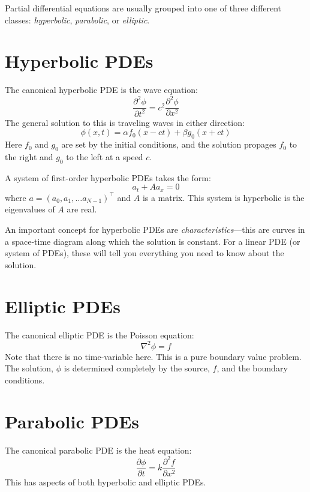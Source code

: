 Partial differential equations are usually grouped into one of 
three different classes: {\em hyperbolic}, {\em parabolic}, 
or {\em elliptic}.


\section{Hyperbolic PDEs}

The canonical hyperbolic PDE is the wave equation:
\begin{equation}
  \frac{\partial^2 \phi}{\partial t^2} = c^2 \frac{\partial^2 \phi}{\partial x^2}
\end{equation}   
The general solution to this is traveling waves in either direction:
\begin{equation}
  \phi(x,t) = \alpha f_0(x - ct) + \beta g_0(x + ct)
\end{equation}
Here $f_0$ and $g_0$ are set by the initial
conditions, and the solution propages $f_0$ to the right and $g_0$ to
the left at a speed $c$.

A system of first-order hyperbolic PDEs takes the form:
\begin{equation}
a_t + A a_x = 0
\end{equation}
where $a = (a_0, a_1, \ldots a_{N-1})^\intercal$ and $A$ is a matrix.
This system is hyperbolic is the eigenvalues of $A$ are real.

An important concept for hyperbolic PDEs are {\em characteristics}---this are
curves in a space-time diagram along which the solution is constant.  For
a linear PDE (or system of PDEs), these will tell you everything you need to 
know about the solution.  


\section{Elliptic PDEs}

The canonical elliptic PDE is the Poisson equation:
\begin{equation}
  \nabla^2 \phi = f
\end{equation}
Note that there is no time-variable here.  This is a pure boundary
value problem.  The solution, $\phi$ is determined completely by the
source, $f$, and the boundary conditions.


\section{Parabolic PDEs}

The canonical parabolic PDE is the heat equation:
\begin{equation}
  \frac{\partial \phi}{\partial t} = k \frac{\partial^2 f}{\partial x^2}
\end{equation}
This has aspects of both hyperbolic and elliptic PDEs.



